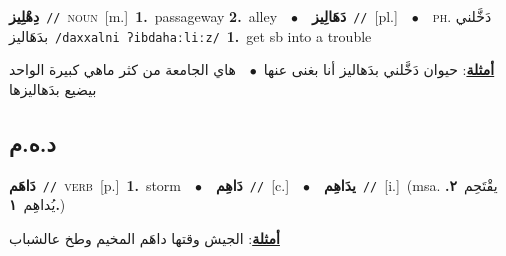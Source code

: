 \documentclass[10pt,a4paper,twoside]{article} %
\begin{document}
\begin{multicols}{2}
{\setlength\topsep{0pt}\textbf{\foreignlanguage{arabic}{دِهْلِيز}}\ {\color{gray}\texttt{//}\color{black}}\ \textsc{noun}\ [m.]\ \textbf{1.}~passageway  \textbf{2.}~alley\ \ $\bullet$\ \ \setlength\topsep{0pt}\textbf{\foreignlanguage{arabic}{دَهَالِيز}}\ {\color{gray}\texttt{//}\color{black}}\ [pl.]\ \ $\bullet$\ \ \textsc{ph.} \color{gray} \foreignlanguage{arabic}{دَخَّلني بدَهَاليز}\color{black}\ {\color{gray}\texttt{/{\sffamily daxxalni ʔibdahaːliːz}/}\color{black}}\ \textbf{1.}~get sb into a trouble\  \begin{flushright}\color{gray}\foreignlanguage{arabic}{\textbf{\underline{\foreignlanguage{arabic}{أمثلة}}}: حيوان دَخَّلني بدَهاليز  أنا بغنى عنها\ $\bullet$\ \  هاي الجامعة من كثر ماهي كبيرة الواحد بيضيع بدَهاليزها}\end{flushright}\color{black}} \vspace{2mm}

\vspace{-3mm}
\subsection*{\color{blue}\foreignlanguage{arabic}{د.ه.م}\color{blue}{}} 

{\setlength\topsep{0pt}\textbf{\foreignlanguage{arabic}{دَاهَم}}\ {\color{gray}\texttt{//}\color{black}}\ \textsc{verb}\ [p.]\ \textbf{1.}~storm\ \ $\bullet$\ \ \setlength\topsep{0pt}\textbf{\foreignlanguage{arabic}{دَاهِم}}\ {\color{gray}\texttt{//}\color{black}}\ [c.]\ \ $\bullet$\ \ \setlength\topsep{0pt}\textbf{\foreignlanguage{arabic}{يدَاهِم}}\ {\color{gray}\texttt{//}\color{black}}\ [i.]\ \color{gray}(msa. \foreignlanguage{arabic}{يقْتَحِم}~\foreignlanguage{arabic}{\textbf{٢.}}  \foreignlanguage{arabic}{يُداهِم}~\foreignlanguage{arabic}{\textbf{١.}})\color{black}\  \begin{flushright}\color{gray}\foreignlanguage{arabic}{\textbf{\underline{\foreignlanguage{arabic}{أمثلة}}}: الجيش وقتها داهَم المخيم وطخ عالشباب}\end{flushright}\color{black}} \vspace{2mm}


\end{multicols}
\end{document}
